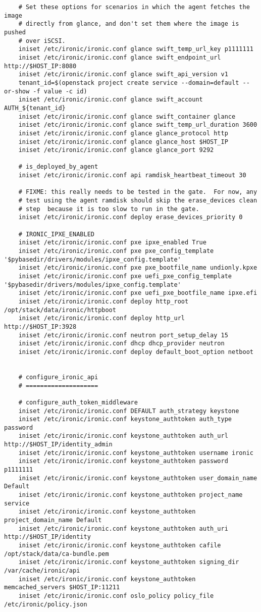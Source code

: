 \documentclass[a4paper,left=1.5cm,right=1.5cm,11pt]{article}
\begin{document}
\begin{lstlisting}
	# Set these options for scenarios in which the agent fetches the image
    # directly from glance, and don't set them where the image is pushed
    # over iSCSI.
	iniset /etc/ironic/ironic.conf glance swift_temp_url_key p1111111
    iniset /etc/ironic/ironic.conf glance swift_endpoint_url http://$HOST_IP:8080
    iniset /etc/ironic/ironic.conf glance swift_api_version v1
	tenant_id=$(openstack project create service --domain=default --or-show -f value -c id)
	iniset /etc/ironic/ironic.conf glance swift_account AUTH_${tenant_id}
    iniset /etc/ironic/ironic.conf glance swift_container glance
    iniset /etc/ironic/ironic.conf glance swift_temp_url_duration 3600
    iniset /etc/ironic/ironic.conf glance glance_protocol http
    iniset /etc/ironic/ironic.conf glance glance_host $HOST_IP
    iniset /etc/ironic/ironic.conf glance glance_port 9292

	# is_deployed_by_agent
	iniset /etc/ironic/ironic.conf api ramdisk_heartbeat_timeout 30

	# FIXME: this really needs to be tested in the gate.  For now, any
    # test using the agent ramdisk should skip the erase_devices clean
    # step  because it is too slow to run in the gate.
	iniset /etc/ironic/ironic.conf deploy erase_devices_priority 0

	# IRONIC_IPXE_ENABLED
	iniset /etc/ironic/ironic.conf pxe ipxe_enabled True
    iniset /etc/ironic/ironic.conf pxe pxe_config_template '$pybasedir/drivers/modules/ipxe_config.template'
    iniset /etc/ironic/ironic.conf pxe pxe_bootfile_name undionly.kpxe
    iniset /etc/ironic/ironic.conf pxe uefi_pxe_config_template '$pybasedir/drivers/modules/ipxe_config.template'
    iniset /etc/ironic/ironic.conf pxe uefi_pxe_bootfile_name ipxe.efi
    iniset /etc/ironic/ironic.conf deploy http_root /opt/stack/data/ironic/httpboot
    iniset /etc/ironic/ironic.conf deploy http_url http://$HOST_IP:3928
	iniset /etc/ironic/ironic.conf neutron port_setup_delay 15
	iniset /etc/ironic/ironic.conf dhcp dhcp_provider neutron
    iniset /etc/ironic/ironic.conf deploy default_boot_option netboot


	# configure_ironic_api
	# ====================

	# configure_auth_token_middleware
	iniset /etc/ironic/ironic.conf DEFAULT auth_strategy keystone
	iniset /etc/ironic/ironic.conf keystone_authtoken auth_type password
    iniset /etc/ironic/ironic.conf keystone_authtoken auth_url http://$HOST_IP/identity_admin
    iniset /etc/ironic/ironic.conf keystone_authtoken username ironic
    iniset /etc/ironic/ironic.conf keystone_authtoken password p1111111
    iniset /etc/ironic/ironic.conf keystone_authtoken user_domain_name Default
    iniset /etc/ironic/ironic.conf keystone_authtoken project_name service
    iniset /etc/ironic/ironic.conf keystone_authtoken project_domain_name Default
    iniset /etc/ironic/ironic.conf keystone_authtoken auth_uri http://$HOST_IP/identity
    iniset /etc/ironic/ironic.conf keystone_authtoken cafile /opt/stack/data/ca-bundle.pem
    iniset /etc/ironic/ironic.conf keystone_authtoken signing_dir /var/cache/ironic/api
    iniset /etc/ironic/ironic.conf keystone_authtoken memcached_servers $HOST_IP:11211
    iniset /etc/ironic/ironic.conf oslo_policy policy_file /etc/ironic/policy.json


\end{lstlisting}
\end{document}
